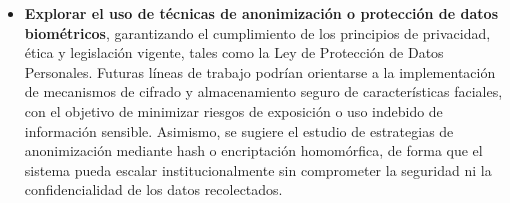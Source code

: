 {\begin{itemize}
    \item \textbf{Explorar el uso de técnicas de anonimización o protección de datos biométricos}, garantizando el cumplimiento de los principios de privacidad, ética y legislación vigente, tales como la Ley de Protección de Datos Personales. Futuras líneas de trabajo podrían orientarse a la implementación de mecanismos de cifrado y almacenamiento seguro de características faciales, con el objetivo de minimizar riesgos de exposición o uso indebido de información sensible. Asimismo, se sugiere el estudio de estrategias de anonimización mediante hash o encriptación homomórfica, de forma que el sistema pueda escalar institucionalmente sin comprometer la seguridad ni la confidencialidad de los datos recolectados.
\end{itemize}
}
